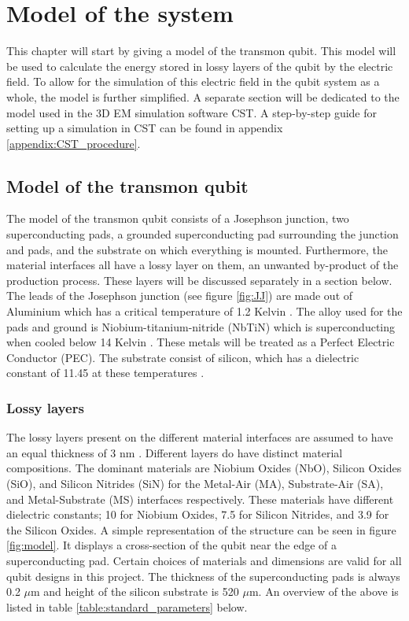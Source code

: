 \chapter{Model of the system}
This chapter will start by giving a model of the transmon qubit. This model will be used to calculate the energy stored in lossy layers of the qubit by the electric field. To allow for the simulation of this electric field in the qubit system as a whole, the model is further simplified. A separate section will be dedicated to the model used in the 3D EM simulation software CST. A step-by-step guide for setting up a simulation in CST can be found in appendix \ref{appendix:CST_procedure}.
 
\section{Model of the transmon qubit}
The model of the transmon qubit consists of a Josephson junction, two superconducting pads, a grounded superconducting pad surrounding the junction and pads, and the substrate on which everything is mounted. Furthermore, the material interfaces all have a lossy layer on them, an unwanted by-product of the production process. These layers will be discussed separately in a section below. The leads of the Josephson junction (see figure \ref{fig:JJ}) are made out of Aluminium which has a critical temperature of 1.2 Kelvin \cite{Cochran1958}. The alloy used for the pads and ground is Niobium-titanium-nitride (NbTiN) which is superconducting when cooled below 14 Kelvin \cite{}. These metals will be treated as a Perfect Electric Conductor (PEC). The substrate consist of silicon, which has a dielectric constant of 11.45 at these temperatures . 

\subsection{Lossy layers}
The lossy layers present on the different material interfaces are assumed to have an equal thickness of 3 nm \cite{Wenner2011}. Different layers do have distinct material compositions. The dominant materials are Niobium Oxides (NbO), Silicon Oxides (SiO), and Silicon Nitrides (SiN) for the Metal-Air (MA), Substrate-Air (SA), and Metal-Substrate (MS) interfaces respectively. These materials have different dielectric constants; 10 for Niobium Oxides, 7.5 for Silicon Nitrides, and 3.9 for the Silicon Oxides. A simple representation of the structure can be seen in figure \ref{fig:model}. It displays a cross-section of the qubit near the edge of a superconducting pad. Certain choices of materials and dimensions are valid for all qubit designs in this project. The thickness of the superconducting pads is always 0.2 \(\mu\)m and height of the silicon substrate is 520 \(\mu\)m. An overview of the above is listed in table \ref{table:standard_parameters} below.

